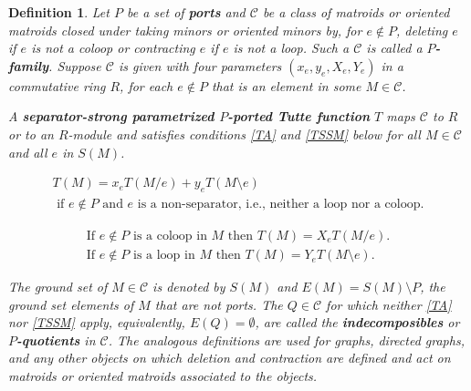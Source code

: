 \documentclass[12pt,leqno]{amsart}
\newtheorem{definition}[lem]{Definition}
\theoremstyle{remark}
\begin{document}
\begin{definition}
\label{SSTMDefinition}
Let $P$ be a set of \textbf{ports} and $\mathcal{C}$ be a class of matroids or
oriented matroids closed under taking minors or oriented minors
by, for $e\not\in P$, deleting $e$ if $e$ is not a coloop or
contracting $e$ if $e$ is not a loop.
Such a $\mathcal{C}$ is called a \textbf{$P$-family}.  
Suppose $\mathcal{C}$ is
given with four parameters $(x_e,y_e,X_e,Y_e)$
in a commutative ring $R$, for each $e\not\in P$ that is an element
in some $M\in\mathcal{C}$.

A \textbf{separator-strong parametrized $P$-ported Tutte function}
$T$ maps $\mathcal{C}$ to $R$ or to an $R$-module and satisfies 
conditions 
\eqref{TA} and \eqref{TSSM} below for all $M\in\mathcal{C}$ and
all $e$ in $S(M)$.


\begin{equation}
\label{TA}
\tag{TA}
\begin{gathered}
T(M) = x_e T(M/e) + y_e T(M\setminus e) \\
\text{ if $e\not\in P$ and $e$ is a non-separator, 
       i.e., neither a loop nor a coloop.}
\end{gathered}
\end{equation}


\begin{equation}
\label{TSSM}
\tag{TSSM}
\begin{gathered}
\text{If } e\not\in P\text{ is a coloop in }M\text{ then }
T(M)=X_e T(M/e).\\
\text{If } e\not\in P\text{ is a loop in }M\text{ then }
T(M)=Y_e T(M\setminus e).
\end{gathered}
\end{equation}

The ground set of $M\in\mathcal{C}$ is denoted by $S(M)$ and
$E(M) = S(M)\setminus P$, the ground set elements of $M$ that are 
not ports.
The $Q\in \mathcal{C}$ for which neither \eqref{TA} nor
\eqref{TSSM} apply, equivalently, $E(Q)=\emptyset$,
are called the \textbf{indecomposibles} or
\textbf{$P$-quotients} in $\mathcal{C}$. The analogous
definitions are used for graphs, directed graphs,
and any other objects on which deletion and contraction are 
defined and act on matroids or oriented matroids associated
to the objects.

\end{definition}
\end{document}
